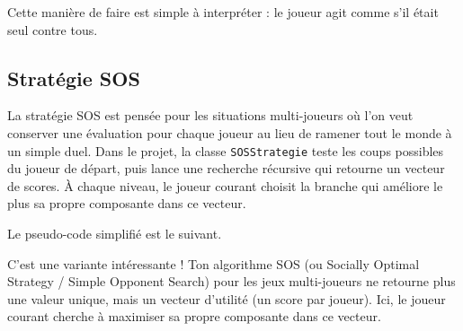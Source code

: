 \documentclass[11pt,a4paper]{article}
\begin{document}
Cette manière de faire est simple à interpréter : le joueur agit comme s'il était seul contre tous.

\subsection{Stratégie SOS}

La stratégie SOS est pensée pour les situations multi-joueurs où l'on veut conserver une évaluation pour chaque joueur au lieu de ramener tout le monde à un simple duel. Dans le projet, la classe \texttt{SOSStrategie} teste les coups possibles du joueur de départ, puis lance une recherche récursive qui retourne un vecteur de scores. À chaque niveau, le joueur courant choisit la branche qui améliore le plus sa propre composante dans ce vecteur.

Le pseudo-code simplifié est le suivant.

C'est une variante intéressante ! Ton algorithme SOS (ou Socially Optimal Strategy / Simple Opponent Search) pour les jeux multi-joueurs ne retourne plus une valeur unique, mais un vecteur d'utilité (un score par joueur). Ici, le joueur courant cherche à maximiser sa propre composante dans ce vecteur. \\



\begin{algorithm}[H]
\DontPrintSemicolon
{}

\caption{Algorithme SOS (Socially Optimal Strategy)}
\end{algorithm}
\end{document}
